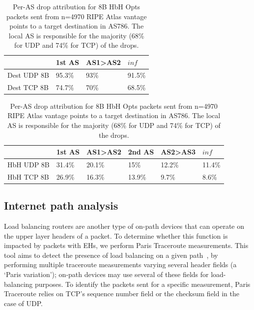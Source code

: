 \documentclass[conference]{IEEEtran}
\begin{document}
\begin{table}[]
\centering
\caption{Per-AS drop attribution for 8B Dest Opts packets sent from n=4970 RIPE Atlas vantage points to a target destination in AS786. The local AS is responsible for the majority (5\% for UDP and 25\% for TCP) of the drops.}
 \label{tbl:uk_as1}

\begin{tabular}{l|l|l|l}
                                   & 1st AS & AS1\textgreater AS2 & $inf $     \\ \hline 

{Dest UDP 8B} & 95.3\% & 93\%                 & 91.5\% \\ \hline

{Dest TCP 8B} & 74.7\% & 70\%                 & 68.5\%
\end{tabular}
\bigskip
\caption{Per-AS drop attribution for 8B HbH Opts packets sent from n=4970 RIPE Atlas vantage points to a target destination in AS786. The local AS is responsible for the majority (68\% for UDP and 74\% for TCP) of the drops.}
\begin{tabular}{p{}|l|l|l|l|l}

              & 1st AS & AS1\textgreater{}AS2 & 2nd AS & AS2\textgreater{}AS3 & $inf$     \\ \hline
HbH UDP 8B & 31.4\% & 20.1\%               & 15\%   & 12.2\%               & 11.4\% \\ \hline
HbH TCP 8B & 26.9\% & 16.3\%               & 13.9\% & 9.7\%                & 8.6\%  \\ 
\end{tabular}
 \label{tbl:uk_as2}
\end{table}


\subsection{Internet path analysis}

Load balancing routers are another type of on-path devices that can operate on the upper layer headers of a packet. To determine whether this function is impacted by packets with EHs, we perform Paris Traceroute measurements. This tool aims to detect the presence of load balancing on a given path~\cite{augustin2006avoiding}, by performing multiple traceroute measurements varying several header fields (a `Paris variation'); on-path devices may use several of these fields for load-balancing purposes. To identify the packets sent for a specific measurement, Paris Traceroute relies on  TCP's sequence number field or the checksum field in the case of UDP.
\end{document}
